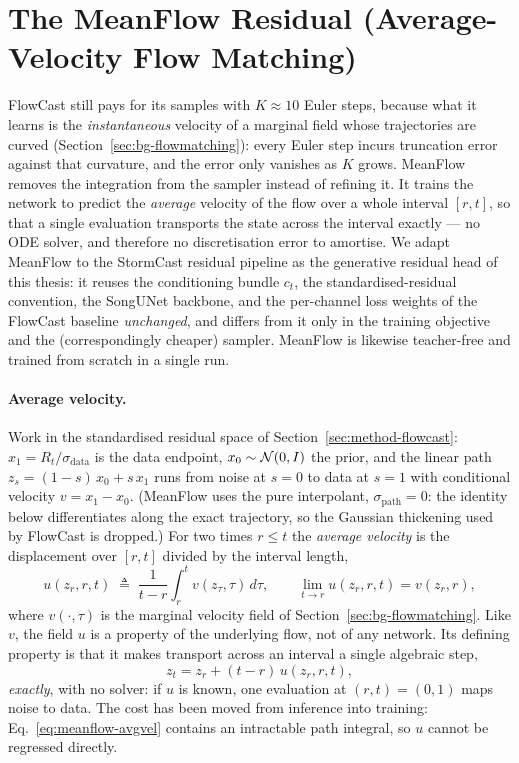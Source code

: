 \section{The MeanFlow Residual (Average-Velocity Flow Matching)}
\label{sec:method-meanflow}

FlowCast still pays for its samples with $K \approx 10$ Euler steps, because what it learns is the \emph{instantaneous} velocity of a marginal field whose trajectories are curved (Section~\ref{sec:bg-flowmatching}): every Euler step incurs truncation error against that curvature, and the error only vanishes as $K$ grows. MeanFlow \citep{geng2025meanflow} removes the integration from the sampler instead of refining it. It trains the network to predict the \emph{average} velocity of the flow over a whole interval $[r, t]$, so that a single evaluation transports the state across the interval exactly --- no ODE solver, and therefore no discretisation error to amortise. We adapt MeanFlow to the StormCast residual pipeline as the generative residual head of this thesis: it reuses the conditioning bundle $c_t$, the standardised-residual convention, the SongUNet backbone, and the per-channel loss weights of the FlowCast baseline \emph{unchanged}, and differs from it only in the training objective and the (correspondingly cheaper) sampler. MeanFlow is likewise teacher-free and trained from scratch in a single run.

\paragraph{Average velocity.} Work in the standardised residual space of Section~\ref{sec:method-flowcast}: $x_1 = R_t / \sigma_{\text{data}}$ is the data endpoint, $x_0 \sim \mathcal{N}(0, I)$ the prior, and the linear path $z_s = (1 - s)\,x_0 + s\,x_1$ runs from noise at $s = 0$ to data at $s = 1$ with conditional velocity $v = x_1 - x_0$. (MeanFlow uses the pure interpolant, $\sigma_{\text{path}} = 0$: the identity below differentiates along the exact trajectory, so the Gaussian thickening used by FlowCast is dropped.) For two times $r \le t$ the \emph{average velocity} is the displacement over $[r, t]$ divided by the interval length,
\begin{equation}
  u(z_r, r, t) \;\triangleq\; \frac{1}{t - r} \int_{r}^{t} v(z_\tau, \tau)\, d\tau,
  \qquad \lim_{t \to r} u(z_r, r, t) = v(z_r, r),
  \label{eq:meanflow-avgvel}
\end{equation}
where $v(\cdot, \tau)$ is the marginal velocity field of Section~\ref{sec:bg-flowmatching}. Like $v$, the field $u$ is a property of the underlying flow, not of any network. Its defining property is that it makes transport across an interval a single algebraic step,
\begin{equation}
  z_t = z_r + (t - r)\, u(z_r, r, t),
  \label{eq:meanflow-displacement}
\end{equation}
\emph{exactly}, with no solver: if $u$ is known, one evaluation at $(r, t) = (0, 1)$ maps noise to data. The cost has been moved from inference into training: Eq.~\eqref{eq:meanflow-avgvel} contains an intractable path integral, so $u$ cannot be regressed directly.

